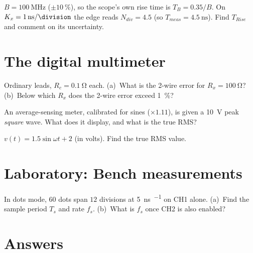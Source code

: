 \documentclass[11pt,a4paper,oneside]{book}
\begin{document}
\begin{exercise}
$B=\qty{100}{\mega\hertz}$ ($\pm\qty{10}{\percent}$), so the scope's own rise time
is $T_B=0.35/B$. On $K_x=\qty{1}{\nano\second\per\division}$ the edge reads
$N_{div}=4.5$ (so $T_{meas}=\qty{4.5}{\nano\second}$).
Find $T_{Rise}$ and comment on its uncertainty.
\end{exercise}

\chapter{The digital multimeter}

\begin{exercise}
Ordinary leads, $R_c=\qty{0.1}{\ohm}$ each.
(a)~What is the 2-wire error for $R_x=\qty{100}{\ohm}$?
(b)~Below which $R_x$ does the 2-wire error exceed \qty{1}{\percent}?
\end{exercise}

\begin{exercise}
An average-sensing meter, calibrated for sines ($\times1.11$), is given a
\qty{10}{\volt} peak \emph{square} wave. What does it display, and what is the
true RMS?
\end{exercise}

\begin{exercise}
$v(t)=1.5\sin\omega t+2$ (in volts). Find the true RMS value.
\end{exercise}

\chapter{Laboratory: Bench measurements}

\begin{exercise}
In dots mode, $60$ dots span $12$ divisions at
\qty{5}{\nano\second\per\division} on CH1 alone.
(a)~Find the sample period $T_s$ and rate $f_s$.
(b)~What is $f_s$ once CH2 is also enabled?
\end{exercise}

\chapter{Answers}\label{ch:answers}
\end{document}
